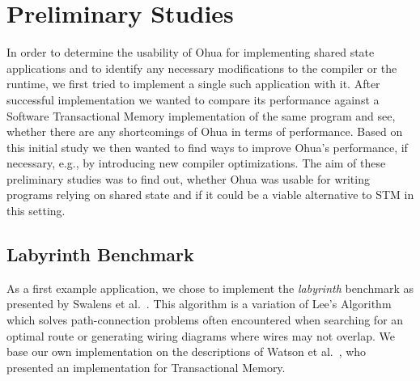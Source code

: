 %
\chapter{Preliminary Studies}
\label{sec:preliminary}

In order to determine the usability of Ohua for implementing shared state applications and to identify any necessary modifications to the compiler or the runtime, we first tried to implement a single such application with it.
After successful implementation we wanted to compare its performance against a Software Transactional Memory implementation of the same program and see, whether there are any shortcomings of Ohua in terms of performance.
Based on this initial study we then wanted to find ways to improve Ohua's performance, if necessary, e.g., by introducing new compiler optimizations.
The aim of these preliminary studies was to find out, whether Ohua was usable for writing programs relying on shared state and if it could be a viable alternative to STM in this setting.

\section{Labyrinth Benchmark}
\label{sec:preliminary:labyrinth}

As a first example application, we chose to implement the \emph{labyrinth} benchmark as presented by Swalens et al.~\cite{swalens2016transactional}.
This algorithm is a variation of Lee's Algorithm~\cite{lee1961algorithm} which solves path-connection problems often encountered when searching for an optimal route or generating wiring diagrams where wires may not overlap.
We base our own implementation on the descriptions of Watson et al.~\cite{watson2007study}, who presented an implementation for Transactional Memory.

